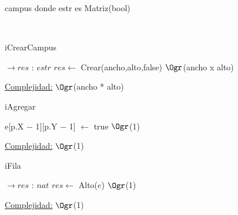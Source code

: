 \begin{Representacion}

	
	\begin{Estructura}{campus}
	donde estr es Matriz(bool)
	\end{Estructura}
	
~	
	
	
\begin{Algoritmos}

	\begin{algorithm}[H]
		\caption{iCrearCampus}
		
		\begin{algorithmic}[1]
			 $\to res$ : $estr$
				\State $res \gets$ Crear(ancho,alto,false) \Comment $\Ogr$(ancho x alto)
			
			\EndProcedure
		\end{algorithmic}
		\underline{Complejidad:} $\Ogr$(ancho * alto)
				
	\end{algorithm}
	
	\begin{algorithm}[H]
		\caption{iAgregar}
		\begin{algorithmic}[1]
				\State e[p.X $-$ 1][p.Y $-$ 1] $\gets$ true \Comment $\Ogr$(1)
			
			\EndProcedure
		\end{algorithmic}
		\underline{Complejidad:} $\Ogr$(1)
	
	
	\end{algorithm}	
	
	\begin{algorithm}[H]
		\caption{iFila}
		\begin{algorithmic}[1]
			 $\to res$ : $nat$
				\State $res \gets$ Alto($e$)	\Comment $\Ogr$(1)
			\EndProcedure		
		\end{algorithmic}
		\underline{Complejidad:} $\Ogr$(1)
	\end{algorithm}
	

\end{Algoritmos}
\end{Representacion}
